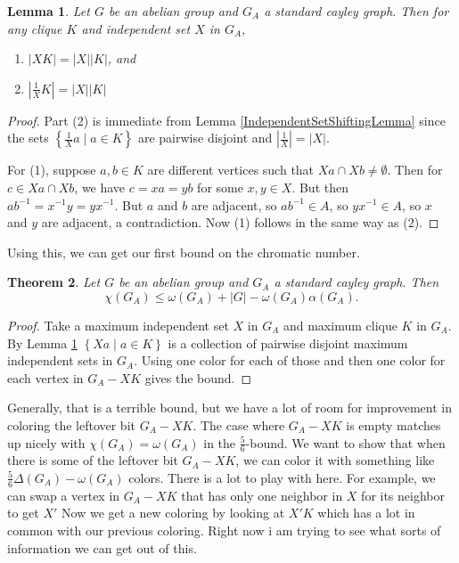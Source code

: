 \documentclass[12pt]{article}
\theoremstyle{plain}
\newtheorem{thm}{Theorem}[section]
\newtheorem{lem}[thm]{Lemma}
\theoremstyle{definition}
\theoremstyle{remark}
\newcommand{\setbs}[2]{\left\{ #1 \mid #2 \right\}}
\newcommand{\card}[1]{\left|#1\right|}
\begin{document}
\begin{lem}\label{IndependentSetShiftingLemmaAbelian}
Let $G$ be an abelian group and $G_A$ a standard cayley graph.   Then for any clique $K$ and independent set $X$ in $G_A$,
\begin{enumerate}
\item $\card{XK} = \card{X}\card{K}$, and\\
\item $\card{\frac{1}{X}K} = \card{X}\card{K}$
\end{enumerate}
\end{lem}
\begin{proof}
Part (2) is immediate from Lemma \ref{IndependentSetShiftingLemma} since the sets $\setbs{\frac{1}{X}a}{a \in K}$ are pairwise disjoint and $\card{\frac{1}{X}} = \card{X}$.

For (1), suppose $a,b \in K$ are different vertices such that $Xa \cap Xb \ne \emptyset$.  Then for $c \in Xa \cap Xb$, we have $c = xa = yb$ for some $x,y \in X$.  But then
$ab^{-1} = x^{-1}y = yx^{-1}$.  But $a$ and $b$ are adjacent, so $ab^{-1} \in A$, so $yx^{-1} \in A$, so $x$ and $y$ are adjacent, a contradiction.  Now (1) follows in the same way as (2).
\end{proof}
Using this, we can get our first bound on the chromatic number.
\begin{thm}\label{OmegaTilingColoring}
Let $G$ be an abelian group and $G_A$ a standard cayley graph.  Then 
\[\chi(G_A) \le \omega(G_A) + |G| - \omega(G_A)\alpha(G_A).\]
\end{thm}
\begin{proof}
Take a maximum independent set $X$ in $G_A$ and maximum clique $K$ in $G_A$.  By Lemma \ref{IndependentSetShiftingLemmaAbelian} $\setbs{Xa}{a \in K}$ is 
a collection of pairwise disjoint maximum independent sets in $G_A$.  Using one color for each of those and then one color for each vertex in $G_A - XK$ gives the bound.
\end{proof}

Generally, that is a terrible bound, but we have a lot of room for improvement in coloring the leftover bit $G_A - XK$.  The case where $G_A - XK$ is empty matches up nicely
with $\chi(G_A) = \omega(G_A)$ in the $\frac56$-bound.  We want to show that when there is some of the leftover bit $G_A - XK$, we can color it with something like $\frac56\Delta(G_A) - \omega(G_A)$ colors.
There is a lot to play with here. For example, we can swap a vertex in $G_A - XK$ that has only one neighbor in $X$ for its neighbor to get $X'$  Now we get a new coloring by looking at $X'K$ which has a lot in common
with our previous coloring.  Right now i am trying to see what sorts of information we can get out of this.
\end{document}
